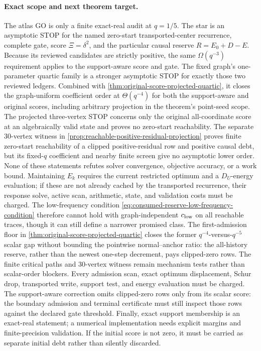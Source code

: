 \paragraph{Exact scope and next theorem target.}
The atlas GO is only a finite exact-real audit at $q=1/5$.  The star is an
asymptotic STOP for the named zero-start transported-center recurrence,
complete gate, score $\Xi=\delta^2$, and the particular causal reserve
$R=E_0+D-E$.  Because its reviewed candidates are strictly positive, the same
$\Omega(q^{-3})$ requirement applies to the support-aware score and gate.
The fixed graph's one-parameter quartic family is a stronger asymptotic STOP
for exactly those two reviewed ledgers.  Combined with
\cref{thm:original-score-projected-quartic}, it closes the graph-uniform
coefficient order at $\Theta(q^{-4})$ for both the support-aware and original
scores, including arbitrary projection in the theorem's point-seed scope.
The projected three-vertex STOP concerns only the original all-coordinate
score at an algebraically valid state and proves no zero-start reachability.
The separate 30-vertex witness in
\cref{prop:reachable-positive-residual-projection} proves finite zero-start
reachability of a clipped positive-residual row and positive causal debt, but
its fixed-$q$ coefficient and nearby finite screen give no asymptotic lower
order.
None of these statements refutes solver convergence, objective accuracy, or
a work bound.  Maintaining $E_k$ requires the current restricted optimum and
a $D_U$-energy evaluation; if these are not already cached by the transported
recurrence, their response solve, active scan, arithmetic, state, and
validation costs must be charged.  The low-frequency condition
\cref{eq:consumed-reserve-low-frequency-condition} therefore cannot hold with
graph-independent $c_{\rm low}$ on all reachable traces, though it can still
define a narrower promised class.  The first-admission floor in
\cref{thm:original-score-projected-quartic} closes the former
$q^{-4}$-versus-$q^{-5}$ scalar gap without bounding the pointwise
normal--anchor ratio: the all-history reserve, rather than the newest
one-step decrement, pays clipped-zero rows.  The finite critical paths and
30-vertex witness remain mechanism tests rather than scalar-order blockers.
Every admission scan, exact optimum displacement, Schur drop,
transported write, support test, and energy evaluation must be charged.  The
support-aware correction omits clipped-zero rows only from its scalar score:
the boundary admission and terminal certificate must still inspect those rows
against the declared gate threshold.  Finally, exact support membership is an
exact-real statement; a numerical implementation needs explicit margins and
finite-precision validation.  If the initial score is not zero, it must be
carried as separate initial debt rather than silently discarded.
